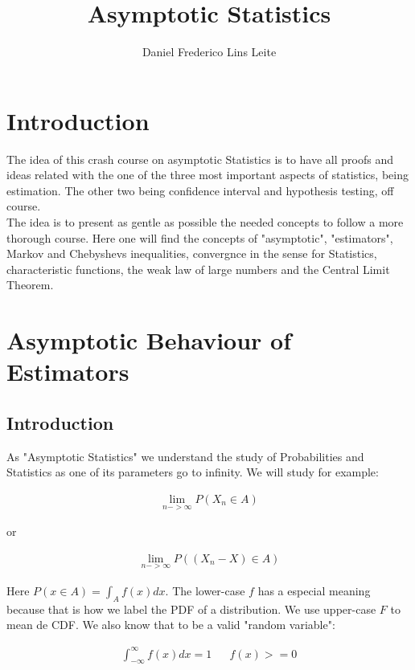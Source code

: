 \documentclass[10pt,a4paper]{book}
\author{Daniel Frederico Lins Leite}
\title{Asymptotic Statistics}
\begin{document}
\maketitle
\tableofcontents

\chapter {Introduction}

The idea of this crash course on asymptotic Statistics is to have all proofs and ideas related with the one of the three most important aspects of statistics, being estimation. The other two being confidence interval and hypothesis testing, off course.\\

The idea is to present as gentle as possible the needed concepts to follow a more thorough course. Here one will find the concepts of "asymptotic", "estimators", Markov and Chebyshevs inequalities, convergnce in the sense for Statistics, characteristic functions, the weak law of large numbers and the Central Limit Theorem.
	
\chapter{Asymptotic Behaviour of Estimators}
\section{Introduction}

As "Asymptotic Statistics" we understand the study of Probabilities and Statistics as one of its parameters go to infinity. We will study for example:

\begin{align}
	\lim_{n->\infty}{P(X_n \in A)}
\end{align}

or 

\begin{align}
	\lim_{n->\infty}{P((X_n - X) \in A)}
\end{align}

Here $P(x \in A) = \int_{A}{f(x)dx}$. The lower-case $f$ has a especial meaning because that is how we label the PDF of a distribution. We use upper-case $F$ to mean de CDF. We also know that to be a valid "random variable":

\begin{align}
	\int_{-\infty}^{\infty}{f(x)dx} = 1 && f(x) >= 0
\end{align}
\end{document}
